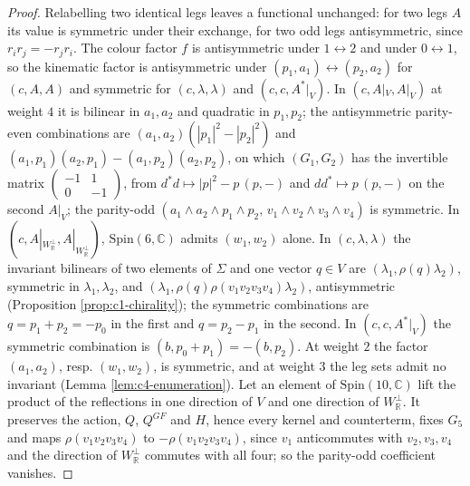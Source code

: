 \begin{proof}
Relabelling two identical legs leaves a functional unchanged: for two legs $A$ its value is symmetric under their exchange, for two odd legs antisymmetric, since $r_ir_j=-r_jr_i$. The colour factor $f$ is antisymmetric under $1\leftrightarrow2$ and under $0\leftrightarrow1$, so the kinematic factor is antisymmetric under $(p_1,a_1)\leftrightarrow(p_2,a_2)$ for $(c,A,A)$ and symmetric for $(c,\lambda,\lambda)$ and $(c,c,A^*|_V)$. In $(c,A|_V,A|_V)$ at weight $4$ it is bilinear in $a_1,a_2$ and quadratic in $p_1,p_2$; the antisymmetric parity-even combinations are $(a_1,a_2)(|p_1|^2-|p_2|^2)$ and $(a_1,p_1)(a_2,p_1)-(a_1,p_2)(a_2,p_2)$, on which $(G_1,G_2)$ has the invertible matrix $\begin{pmatrix}-1&1\\0&-1\end{pmatrix}$, from $d^*d\mapsto|p|^2-p\,(p,-)$ and $dd^*\mapsto p\,(p,-)$ on the second $A|_V$; the parity-odd $(a_1\wedge a_2\wedge p_1\wedge p_2,\,v_1\wedge v_2\wedge v_3\wedge v_4)$ is symmetric. In $(c,A|_{W_{\mathbb R}^\perp},A|_{W_{\mathbb R}^\perp})$, $\mathrm{Spin}(6,\mathbb C)$ admits $(w_1,w_2)$ alone. In $(c,\lambda,\lambda)$ the invariant bilinears of two elements of $\Sigma$ and one vector $q\in V$ are $(\lambda_1,\rho(q)\lambda_2)$, symmetric in $\lambda_1,\lambda_2$, and $(\lambda_1,\rho(q)\rho(v_1v_2v_3v_4)\lambda_2)$, antisymmetric (Proposition \ref{prop:c1-chirality}); the symmetric combinations are $q=p_1+p_2=-p_0$ in the first and $q=p_2-p_1$ in the second. In $(c,c,A^*|_V)$ the symmetric combination is $(b,p_0+p_1)=-(b,p_2)$. At weight $2$ the factor $(a_1,a_2)$, resp. $(w_1,w_2)$, is symmetric, and at weight $3$ the leg sets admit no invariant (Lemma \ref{lem:c4-enumeration}). Let an element of $\mathrm{Spin}(10,\mathbb C)$ lift the product of the reflections in one direction of $V$ and one direction of $W_{\mathbb R}^\perp$. It preserves the action, $Q$, $Q^{GF}$ and $H$, hence every kernel and counterterm, fixes $G_5$ and maps $\rho(v_1v_2v_3v_4)$ to $-\rho(v_1v_2v_3v_4)$, since $v_1$ anticommutes with $v_2,v_3,v_4$ and the direction of $W_{\mathbb R}^\perp$ commutes with all four; so the parity-odd coefficient vanishes.
\end{proof}

